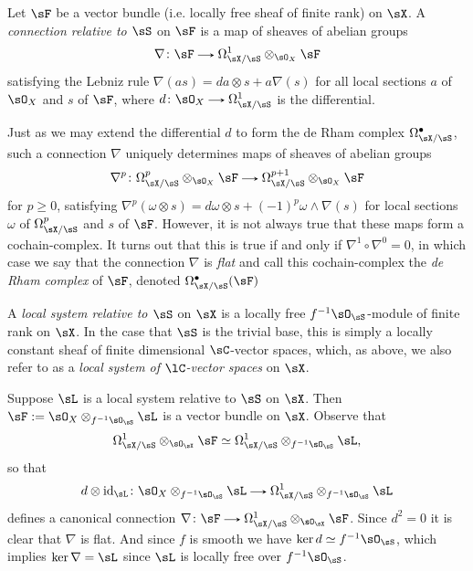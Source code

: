 \begin{definition}
  \label{gm--local--connection}
  Let $\sF$ be a vector bundle (i.e. locally free sheaf of finite rank) on $\sX$. A \emph{connection relative to $\sS$} on $\sF$ is a map of sheaves of abelian groups
  \[
    \nabla \c \sF \to \Omega_{\sX/\sS}^1 \otimes_{\sO_X} \sF
  \]
  satisfying the Lebniz rule $\nabla(as) = da \otimes s + a\nabla(s)$ for all local sections $a$ of $\sO_X$ and $s$ of $\sF$, where $d \c \sO_X \to \Omega_{\sX/\sS}^1$ is the differential.

  Just as we may extend the differential $d$ to form the de Rham complex $\Omega_{\sX/\sS}^\bullet$, such a connection $\nabla$ uniquely determines maps of sheaves of abelian groups
  \[
    \nabla^p \c \Omega_{\sX/\sS}^p \otimes_{\sO_X} \sF \to \Omega_{\sX/\sS}^{p+1} \otimes_{\sO_X} \sF
  \]
  for $p \ge 0$, satisfying $\nabla^p(\omega \otimes s) = d\omega \otimes s + (-1)^p \omega \wedge \nabla(s)$ for local sections $\omega$ of $\Omega_{\sX/\sS}^p$ and $s$ of $\sF$. However, it is not always true that these maps form a cochain-complex. It turns out that this is true if and only if $\nabla^1 \circ \nabla^0 = 0$, in which case we say that the connection $\nabla$ is \emph{flat} and call this cochain-complex the \emph{de Rham complex} of $\sF$, denoted $\Omega_{\sX/\sS}^\bullet(\sF)$
\end{definition}

\begin{definition}
  \label{gm--local--local-system}
  A \emph{local system relative to $\sS$} on $\sX$ is a locally free $f^{-1}\sO_\sS$-module of finite rank on $\sX$. In the case that $\sS$ is the trivial base, this is simply a locally constant sheaf of finite dimensional $\sC$-vector spaces, which, as above, we also refer to as a \emph{local system of $\lC$-vector spaces} on $\sX$.
\end{definition}

\begin{nothing}
  \label{gm--local--local-system-to-connection}
  Suppose $\sL$ is a local system relative to $\sS$ on $\sX$. Then $\sF \ce \sO_X \otimes_{f^{-1}\sO_\sS} \sL$ is a vector bundle on $\sX$. Observe that
  \[
    \Omega_{\sX/\sS}^1 \otimes_{\sO_\sX} \sF \iso
    \Omega_{\sX/\sS}^1 \otimes_{f^{-1}\sO_\sS} \sL,
  \]
  so that
  \[
    d \otimes \id_\sL \c \sO_X \otimes_{f^{-1}\sO_\sS} \sL \to \Omega_{\sX/\sS}^1 \otimes_{f^{-1}\sO_\sS} \sL
  \]
  defines a canonical connection $\nabla \c \sF \to \Omega_{\sX/\sS}^1 \otimes_{\sO_\sX} \sF$. Since $d^2 = 0$ it is clear that $\nabla$ is flat. And since $f$ is smooth we have $\ker d \iso f^{-1}\sO_\sS$, which implies $\ker \nabla = \sL$ since $\sL$ is locally free over $f^{-1}\sO_\sS$.
\end{nothing}

